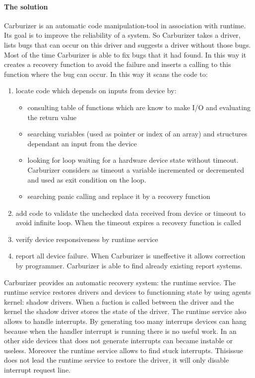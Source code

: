 \documentclass[10pt]{article}
\begin{document}
\paragraph{The solution}
Carburizer is an automatic code manipulation-tool in association with runtime.
Its goal is to improve the reliability of a system. So Carburizer takes a driver, lists bugs that can occur on this driver and suggests a driver without those bugs. Most of the time Carburizer is able to fix bugs that it had found. In this way it creates a recovery function to avoid the failure and inserts a calling to this function where the bug can occur. In this way it scans the code to:
\begin{enumerate}
\item locate code which depends on inputs from device by:
  \begin{itemize}
    \item consulting table of functions which are know to make I/O and evaluating the return value
    \item searching variables (used as pointer or index of an array) and structures dependant an input from the device
    \item looking for loop waiting for a hardware device state without timeout. Carburizer considers as timeout a variable incremented or decremented and used as exit condition on the loop.
    \item searching panic calling and replace it by a recovery function
  \end{itemize}
\item add code to validate the unchecked data received from device or timeout to avoid infinite loop. When the timeout expires a recovery function is called
\item verify device responsiveness by runtime service
\item report all device failure. When Carburizer is uneffective it allows correction by programmer. Carburizer is able to find already existing report systems.
\end{enumerate}

Carburizer provides an automatic recovery system: the runtime service. The runtime service restores drivers and devices to functionning state by using agents kernel: shadow drivers. When a fuction is called between the driver and the kernel the shadow driver stores the state of the driver.
The runtime service also allows to handle interrupts. By generating too many interrups devices can hang because when the handler interrupt is running there is no useful work. In an other side devices that does not generate interrupts can became instable or useless. Moreover the runtime service allows to find stuck interrupts. Thisissue does not lead the runtime service to restore the driver, it will only disable interrupt request line.
\end{document}
